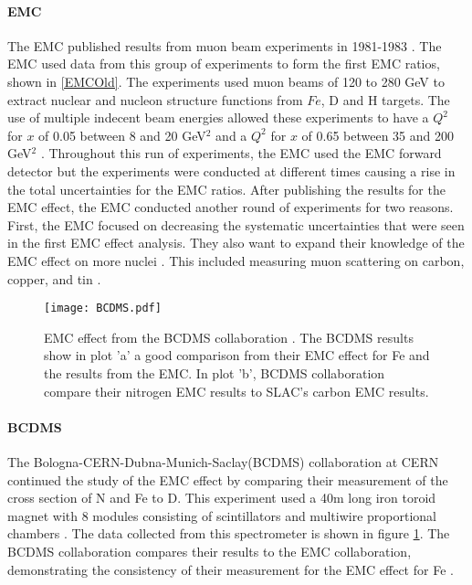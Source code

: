 \paragraph{EMC} The EMC published results from muon beam experiments in 1981-1983 \cite{EMC_iron,EM,EMC_F2d,CERN_EMC}.  The EMC used data from this group of experiments to form the first EMC ratios, shown in \ref{EMCOld}. The experiments used muon beams of 120 to 280 GeV to extract nuclear and nucleon structure functions from $Fe$, D and H targets. The use of multiple indecent beam energies allowed these experiments to have a $Q^2$ for $x$ of 0.05 between 8 and 20 GeV$^2$ and a $Q^2$ for $x$ of 0.65 between 35 and 200 GeV$^2$ \cite{CERN_EMC}. Throughout this run of experiments, the EMC used the EMC forward detector but the experiments were conducted at different times causing a rise in the total uncertainties for the EMC ratios\cite{EM}. After publishing the results for the EMC effect, the EMC conducted another round of experiments for two reasons. First, the EMC focused on decreasing the systematic uncertainties that were seen in the first EMC effect analysis. They also want to expand their knowledge of the EMC effect on more nuclei \cite{EMC_ext, Ajth}. This included measuring muon scattering on carbon, copper, and tin \cite{EMC_ext}.

\begin{figure}[t]
	\centering
	\texttt{[image: BCDMS.pdf]}
		\caption{EMC effect from the BCDMS collaboration \cite{BCDMS}. The BCDMS results show in plot 'a' a good comparison from their EMC effect for Fe and the results from the EMC. In plot 'b', BCDMS collaboration compare their nitrogen EMC results to SLAC's carbon EMC results.}
	\label{fig:BCDMS}
\end{figure}
\paragraph{BCDMS}The Bologna-CERN-Dubna-Munich-Saclay(BCDMS) collaboration at CERN continued the study of the EMC effect by comparing their measurement of the cross section of N and Fe to D. This experiment used a 40m long iron toroid magnet with 8 modules consisting of scintillators and multiwire proportional chambers \cite{BCDMS}. The data collected from this spectrometer is shown in figure \ref{fig:BCDMS}. The BCDMS collaboration compares their results to the EMC collaboration, demonstrating the consistency of their measurement for the EMC effect for Fe \cite{BCDMS,Norton}.

